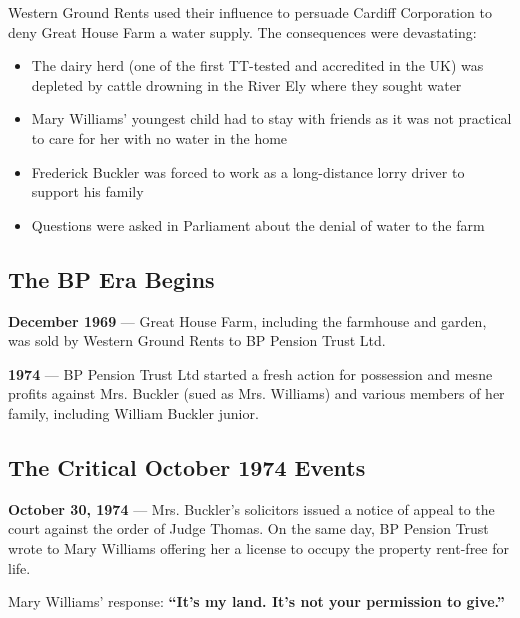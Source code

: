 \documentclass[11pt,a4paper]{article}
\begin{document}
\begin{grievance}
Western Ground Rents used their influence to persuade Cardiff Corporation to deny Great House Farm a water supply. The consequences were devastating:
\begin{itemize}
    \item The dairy herd (one of the first TT-tested and accredited in the UK) was depleted by cattle drowning in the River Ely where they sought water
    \item Mary Williams' youngest child had to stay with friends as it was not practical to care for her with no water in the home
    \item Frederick Buckler was forced to work as a long-distance lorry driver to support his family
    \item Questions were asked in Parliament about the denial of water to the farm
\end{itemize}
\end{grievance}

\subsection{The BP Era Begins}

\begin{timeline}
\textbf{December 1969} --- Great House Farm, including the farmhouse and garden, was sold by Western Ground Rents to BP Pension Trust Ltd.
\end{timeline}

\begin{timeline}
\textbf{1974} --- BP Pension Trust Ltd started a fresh action for possession and mesne profits against Mrs. Buckler (sued as Mrs. Williams) and various members of her family, including William Buckler junior.
\end{timeline}

\subsection{The Critical October 1974 Events}

\begin{keyfact}
\textbf{October 30, 1974} --- Mrs. Buckler's solicitors issued a notice of appeal to the court against the order of Judge Thomas. On the same day, BP Pension Trust wrote to Mary Williams offering her a license to occupy the property rent-free for life.

Mary Williams' response: \textbf{``It's my land. It's not your permission to give.''}
\end{keyfact}
\end{document}
